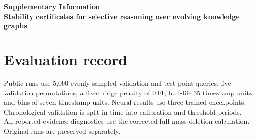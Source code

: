 \documentclass[preprint,12pt]{elsarticle}
\begin{document}
\begin{center}\Large\bfseries Supplementary Information\\[0.4em]
Stability certificates for selective reasoning over evolving knowledge graphs\end{center}
\section*{Evaluation record}
Public runs use 5,000 evenly sampled validation and test point queries, five validation permutations, a fixed ridge penalty of 0.01, half-life 35 timestamp units and bins of seven timestamp units. Neural results use three trained checkpoints. Chronological validation is split in time into calibration and threshold periods. All reported evidence diagnostics use the corrected full-mass deletion calculation. Original runs are preserved separately.
\begin{table}[htbp]
\centering
\caption{Public results. B/S denotes baseline/StableKG. Coverage targets are set on validation data; realized test coverage can differ.}
\small
{}
\end{table}
\begin{table}[htbp]
\centering
\caption{Paired differences (StableKG minus baseline), seed 0, 1,000 resamples of contiguous timestamp blocks. Risk uses frozen validation thresholds separately for each method; these are not equal accepted-count comparisons.}
\small
{}
\end{table}
\end{document}
